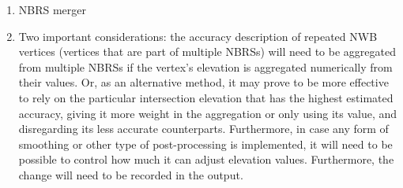\begin{enumerate}
\begin{enumerate}
    \end{enumerate}
    \item NBRS merger
    \item[] Two important considerations: the accuracy description of repeated NWB vertices (vertices that are part of multiple NBRSs) will need to be aggregated from multiple NBRSs if the vertex’s elevation is aggregated numerically from their values. Or, as an alternative method, it may prove to be more effective to rely on the particular intersection elevation that has the highest estimated accuracy, giving it more weight in the aggregation or only using its value, and disregarding its less accurate counterparts. Furthermore, in case any form of smoothing or other type of post-processing is implemented, it will need to be possible to control how much it can adjust elevation values. Furthermore, the change will need to be recorded in the output.
\end{enumerate}

